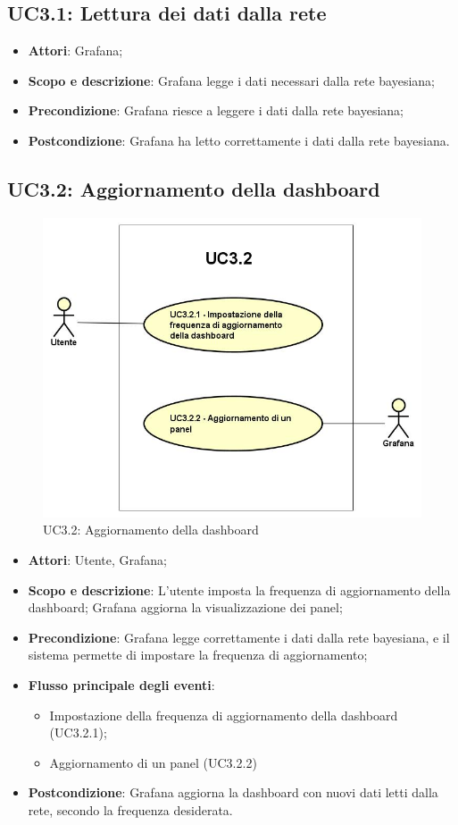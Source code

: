 \subsection{UC3.1: Lettura dei dati dalla rete}
\hypertarget{UC3.1}{}
\begin{itemize}
	\item \textbf{Attori}: Grafana;
	\item \textbf{Scopo e descrizione}: Grafana legge i dati necessari dalla rete bayesiana;
	\item \textbf{Precondizione}: Grafana riesce a leggere i dati dalla rete bayesiana;
	\item \textbf{Postcondizione}: Grafana ha letto correttamente i dati dalla rete bayesiana.
\end{itemize}
\subsection{UC3.2: Aggiornamento della dashboard}
\hypertarget{UC3.2}{}
\begin{figure} [H]
	\centering
	\includegraphics[scale=0.45]{Img/UC3-2}
	\caption{UC3.2: Aggiornamento della dashboard}\label{}
\end{figure}
\begin{itemize}
	\item \textbf{Attori}: Utente, Grafana;
	\item \textbf{Scopo e descrizione}: L'utente imposta la frequenza di aggiornamento della dashboard; Grafana aggiorna la visualizzazione dei panel;
	\item \textbf{Precondizione}: Grafana legge correttamente i dati dalla rete bayesiana, e il sistema permette di impostare la frequenza di aggiornamento;
	\item \textbf{Flusso principale degli eventi}:
		\begin{itemize}
			\item Impostazione della frequenza di aggiornamento della dashboard (UC3.2.1);
			\item Aggiornamento di un panel (UC3.2.2)
		\end{itemize}
	\item \textbf{Postcondizione}: Grafana aggiorna la dashboard con nuovi dati letti dalla rete, secondo la frequenza desiderata.
\end{itemize}
